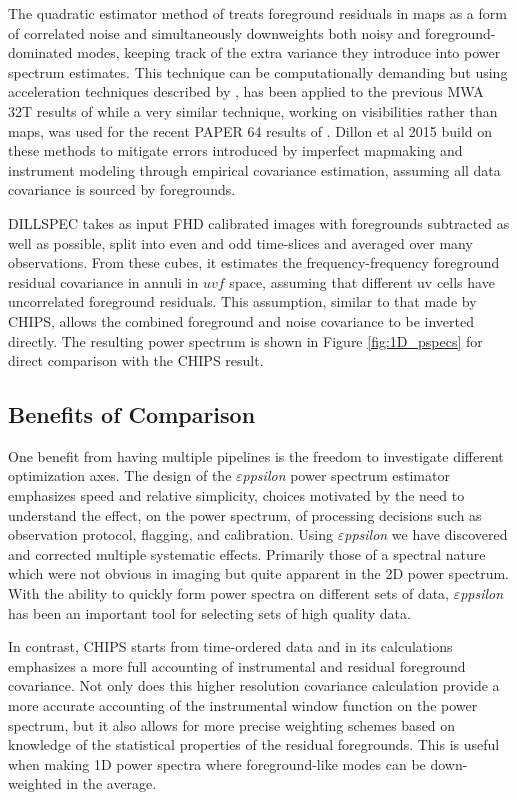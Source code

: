 \documentclass[twolcolumn,iop]{emulateapj}
\def\eppsilon{{\it $\varepsilon$ppsilon}}
\def\empirical{DILLSPEC}
\def\dilloncite{Dillon et al 2015 }
\begin{document}
The quadratic estimator method of \cite{Liu:2011p8763} treats foreground residuals in maps as a form of correlated noise and simultaneously downweights both noisy and foreground-dominated modes, keeping track of the extra variance they introduce into power spectrum estimates. This technique can be computationally demanding but using acceleration techniques described by \cite{Dillon:2013p10497}, has been applied to the previous MWA 32T results of \cite{Dillon:2014p9788} while a very similar technique, working on visibilities rather than maps, was used for the recent PAPER 64 results of \cite{2015ApJ...809...61A}.  \dilloncite{} build on these methods to mitigate errors introduced by imperfect mapmaking and instrument modeling through empirical covariance estimation, assuming all data covariance is sourced by foregrounds.

\empirical{} takes as input FHD calibrated images with foregrounds subtracted as well as possible, split into even and odd time-slices and averaged over many observations. From these cubes, it estimates the frequency-frequency foreground residual covariance in annuli in $uvf$ space, assuming that different uv cells have uncorrelated foreground residuals. This assumption, similar to that made by CHIPS, allows the combined foreground and noise covariance to be inverted directly. The resulting power spectrum is shown in Figure \ref{fig:1D_pspecs} for direct comparison with the CHIPS result. 



\subsection{Benefits of Comparison}
\label{sec:benefits_of_comparison}


One benefit from having multiple pipelines is the freedom to investigate  different optimization axes.  The design of the \eppsilon{} power spectrum estimator emphasizes speed and relative simplicity, choices  motivated by the need to understand the effect, on the power spectrum, of processing decisions such as observation protocol, flagging, and calibration. Using \eppsilon{} we have discovered and corrected multiple systematic effects. Primarily those of a spectral nature which were not obvious in imaging but quite apparent in the 2D power spectrum. With the ability to quickly form power spectra on different sets of data, \eppsilon{} has been an important tool for selecting sets of high quality data. 

In contrast, CHIPS starts from time-ordered data and in its calculations emphasizes a more full accounting of instrumental and residual foreground covariance. Not only does this higher resolution covariance calculation provide a more accurate accounting of the instrumental window function on the power spectrum, but it also allows for more precise weighting schemes based on knowledge of the statistical properties of the residual foregrounds. This is useful when making 1D power spectra where foreground-like modes can be down-weighted in the average. 
\end{document}
